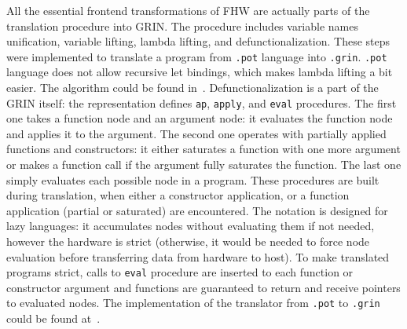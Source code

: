 All the essential frontend transformations of FHW are actually parts of the translation procedure into GRIN. The procedure includes variable names unification, variable lifting, lambda lifting,  and defunctionalization. These steps were implemented to translate a program from \texttt{.pot} language into \texttt{.grin}. \texttt{.pot} language does not allow recursive let bindings, which makes lambda lifting a bit easier. The algorithm could be found in~\cite{lambda-lift}. Defunctionalization is a part of the GRIN itself: the representation defines \texttt{ap}, \texttt{apply}, and \texttt{eval} procedures. The first one takes a function node and an argument node: it evaluates the function node and applies it to the argument. The second one operates with partially applied functions and constructors: it either saturates a function with one more argument or makes a function call if the argument fully saturates the function. The last one simply evaluates each possible node in a program.  These procedures are built during translation, when either a constructor application, or a function application (partial or saturated) are encountered. The notation is designed for lazy languages: it accumulates nodes without evaluating them if not needed, however the hardware is strict (otherwise, it would be needed to force node evaluation before transferring data from hardware to host). To make translated programs strict, calls to \texttt{eval} procedure are inserted to each function or constructor argument and functions are guaranteed to return and receive pointers to evaluated nodes. The implementation of the translator from \texttt{.pot} to \texttt{.grin} could be found at~\cite{grin-rep}.

